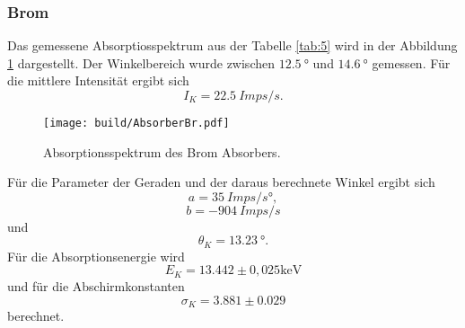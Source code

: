 \subsubsection{Brom}
Das gemessene Absorptiosspektrum aus der Tabelle \ref{tab:5} wird in der Abbildung \ref{fig:AbBr} dargestellt.
Der Winkelbereich wurde zwischen $\qty{12.5}{°}$ und $\qty{14.6}{°}$ gemessen.
Für die mittlere Intensität ergibt sich 
\begin{equation*}
    I_K = \qty{22.5}{Imps/s}.
\end{equation*}

\begin{figure}[H]
    \centering
    \texttt{[image: build/AbsorberBr.pdf]}
    \caption{Absorptionsspektrum des Brom Absorbers.}
    \label{fig:AbBr}
\end{figure}
\noindent Für die Parameter der Geraden und der daraus berechnete Winkel ergibt sich 
\begin{equation*}
    a = \qty{35}{Imps/s°},
\end{equation*}
\begin{equation*}
    b = \qty{-904}{Imps/s}
\end{equation*}
und
\begin{equation*}
    \theta_K = \qty{13.23}{°}.
\end{equation*}
Für die Absorptionsenergie wird 
\begin{equation*}
    E_K = 13.442 \pm 0,025 \unit{\kilo\electronvolt}
\end{equation*}
und für die Abschirmkonstanten
\begin{equation*}
     \sigma_K = 3.881 \pm 0.029
\end{equation*}
berechnet.

